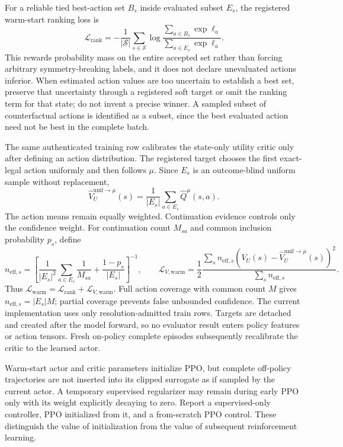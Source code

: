 For a reliable tied best-action set \(B_s\) inside evaluated subset \(E_s\), the registered
warm-start ranking loss is
\[
 \mathcal L_{\mathrm{rank}}
 =-\frac{1}{|\mathcal S|}\sum_{s\in\mathcal S}
 \log\frac{\sum_{a\in B_s}\exp\ell_a}
 {\sum_{a\in E_s}\exp\ell_a}.
\]
This rewards probability mass on the entire accepted set rather than forcing arbitrary
symmetry-breaking labels, and it does not declare unevaluated actions inferior. When estimated
action values are too uncertain to establish a best set, preserve that uncertainty through a
registered soft target or omit the ranking term for that state; do not invent a precise winner. A
sampled subset of counterfactual actions is identified as a subset, since the best evaluated
action need not be best in the complete batch.

The same authenticated training row calibrates the state-only utility critic only after defining
an action distribution. The registered target chooses the first exact-legal action uniformly and
then follows \(\mu\). Since \(E_s\) is an outcome-blind uniform sample without replacement,
\[
 \widehat V_U^{\mathrm{unif}\rightarrow\mu}(s)
 =\frac{1}{|E_s|}\sum_{a\in E_s}\widehat Q^\mu(s,a).
\]
The action means remain equally weighted. Continuation evidence controls only the confidence
weight. For continuation count \(M_{sa}\) and common inclusion probability \(p_s\), define
\[
 n_{\mathrm{eff},s}=\left[
 \frac{1}{|E_s|^2}\sum_{a\in E_s}\frac{1}{M_{sa}}
 +\frac{1-p_s}{|E_s|}\right]^{-1},
 \qquad
 \mathcal L_{V,\mathrm{warm}}=
 \frac{1}{2}\frac{\sum_s n_{\mathrm{eff},s}
 (V_U(s)-\widehat V_U^{\mathrm{unif}\rightarrow\mu}(s))^2}
 {\sum_s n_{\mathrm{eff},s}}.
\]
Thus \(\mathcal L_{\mathrm{warm}}=\mathcal L_{\mathrm{rank}}+
\mathcal L_{V,\mathrm{warm}}\). Full action coverage with common count \(M\) gives
\(n_{\mathrm{eff},s}=|E_s|M\); partial coverage prevents false unbounded confidence. The current
implementation uses only resolution-admitted train rows. Targets are detached and created after
the model forward, so no evaluator result enters policy features or action tensors. Fresh
on-policy complete episodes subsequently recalibrate the critic to the learned actor.

Warm-start actor and critic parameters initialize PPO, but complete off-policy trajectories are
not inserted into its clipped surrogate as if sampled by the current actor. A temporary supervised
regularizer may remain during early PPO only with its weight explicitly decaying to zero. Report a
supervised-only controller, PPO initialized from it, and a from-scratch PPO control. These distinguish
the value of initialization from the value of subsequent reinforcement learning.

